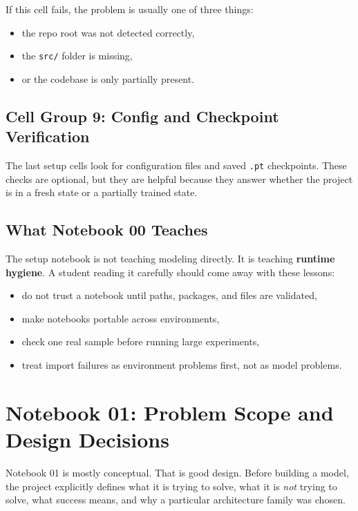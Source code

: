 \documentclass[11pt,a4paper]{report}
\begin{document}
If this cell fails, the problem is usually one of three things:

\begin{itemize}
\item the repo root was not detected correctly,
\item the \texttt{src/} folder is missing,
\item or the codebase is only partially present.
\end{itemize}

\section{Cell Group 9: Config and Checkpoint Verification}

The last setup cells look for configuration files and saved \texttt{.pt} checkpoints. These checks are optional, but they are helpful because they answer whether the project is in a fresh state or a partially trained state.

\section{What Notebook 00 Teaches}

The setup notebook is not teaching modeling directly. It is teaching \textbf{runtime hygiene}. A student reading it carefully should come away with these lessons:

\begin{itemize}
\item do not trust a notebook until paths, packages, and files are validated,
\item make notebooks portable across environments,
\item check one real sample before running large experiments,
\item treat import failures as environment problems first, not as model problems.
\end{itemize}

\chapter{Notebook 01: Problem Scope and Design Decisions}

Notebook 01 is mostly conceptual. That is good design. Before building a model, the project explicitly defines what it is trying to solve, what it is \emph{not} trying to solve, what success means, and why a particular architecture family was chosen.
\end{document}

